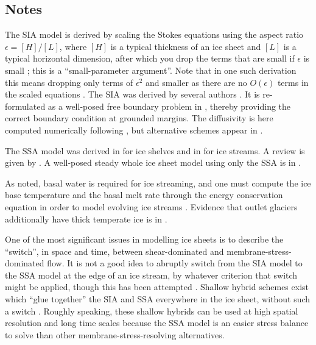 \documentclass[titlepage,a4paper,final,12pt]{scrartcl}
\newcommand{\eps}{\epsilon}
\begin{document}
\small
\subsection{Notes} \label{sec:nr}

The SIA model is derived by scaling the Stokes equations using the aspect ratio $\eps = [H]/[L]$, where $[H]$ is a typical thickness of an ice sheet and $[L]$ is a typical horizontal dimension, after which you drop the terms that are small if $\eps$ is small \cite{Fowler,Hutter}; this is a ``small-parameter argument''.  Note that in one such derivation this means dropping only terms of $\eps^2$ and smaller as there are no $O(\eps)$ terms in the scaled equations \cite{Fowler}.  The SIA was derived by several authors \cite{FowlerLarson1978,Hutter,MorlandJohnson}.  It is re-formulated as a well-posed free boundary problem in \cite{JouvetBueler2012}, thereby providing the correct boundary condition at grounded margins.  The diffusivity is here computed numerically following \cite{Mahaffy}, but alternative schemes appear in \cite{HindmarshPayne}.

The SSA model was derived in \cite{Morland} for ice shelves and in \cite{MacAyeal} for ice streams.  A review is given by \cite{WeisGreveHutter}.  A well-posed steady whole ice sheet model using only the SSA is in \cite{SchoofStream}.

As noted, basal water is required for ice streaming, and one must compute the ice base temperature and the basal melt rate through the energy conservation equation in order to model evolving ice streams \cite{BBssasliding,Clarke05,Raymondenergy}.  Evidence that outlet glaciers additionally have thick temperate ice is in \cite{Luethietal2009}.

One of the most significant issues in modelling ice sheets is to describe the ``switch'', in space and time, between shear-dominated and membrane-stress-dominated flow.  It is not a good idea to abruptly switch from the SIA model to the SSA model at the edge of an ice stream, by whatever criterion that switch might be applied, though this has been attempted \cite{HulbeMacAyeal,Ritzetal2001}.  Shallow hybrid schemes exist which ``glue together'' the SIA and SSA everywhere in the ice sheet, without such a switch \cite{BBssasliding,Goldberg2011,PollardDeConto}.  Roughly speaking, these shallow hybrids can be used at high spatial resolution and long time scales because the SSA model is an easier stress balance to solve than other membrane-stress-resolving alternatives.
\end{document}
